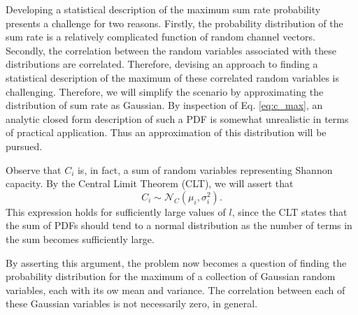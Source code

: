 Developing a statistical description of the maximum sum rate probability presents a challenge for two reasons. Firstly, the probability distribution of the sum rate is a relatively complicated function of random channel vectors. Secondly, the correlation between the random variables associated with these distributions are correlated. Therefore, devising an approach to finding a statistical description of the maximum of these correlated random variables is challenging. Therefore, we will simplify the scenario by approximating the distribution of sum rate as Gaussian. By inspection of Eq. \ref{eq:c_max}, an analytic closed form description of such a PDF is  somewhat unrealistic in terms of practical application. Thus an approximation of this distribution will be pursued.

Observe that $C_i$ is, in fact, a sum of random variables representing Shannon capacity. By the Central Limit Theorem (CLT), we will assert that 
\begin{equation}
    C_i\sim\mathcal{N}_C(\mu_i,\sigma_i^2). 
\end{equation}
This expression holds for sufficiently large values of $l$, since the CLT states that the sum of PDFs should tend to a normal distribution as the number of terms in the sum becomes sufficiently large.

By asserting this argument, the problem now becomes a question of finding the probability distribution for the maximum of a collection of Gaussian random variables, each with its ow mean and variance. The correlation between each of these Gaussian variables is not necessarily zero, in general.
